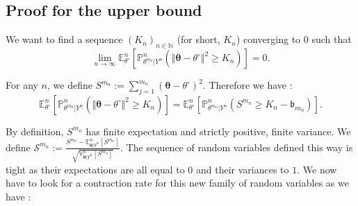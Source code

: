 %
%

\subsection{Proof for the upper bound}

We want to find a sequence $\left(K_{n}\right)_{n \in \mathds{N}}$ (for short, $K_{n}$) converging to $0$ such that
\[\lim\limits_{n \rightarrow \infty} \mathds{E}_{\theta^{\circ}}^{n}\left[\mathds{P}_{\theta^{m_{n}}\vert Y^{n}}^{n}\left(\Vert \boldsymbol{\theta} - \theta^{\circ} \Vert^{2} \geq K_{n}\right)\right] = 0.\]

For any $n$, we define $S^{m_{n}} := \sum_{j=1}^{m_{n}} \left(\boldsymbol{\theta} - \theta^{\circ}\right)^{2}$. Therefore we have : 
\[\mathds{E}_{\theta^{\circ}}^{n}\left[\mathds{P}_{\theta^{m_{n}}\vert Y^{n}}^{n}\left(\Vert \boldsymbol{\theta} - \theta^{\circ} \Vert^{2} \geq K_{n}\right)\right] = \mathds{E}_{\theta^{\circ}}^{n}\left[\mathds{P}_{\theta^{m_{n}}\vert Y^{n}}^{n}\left(S^{m_{n}} \geq K_{n} - \mathfrak{b}_{m_{n}}\right)\right].\]

By definition, $S^{m_{n}}$ has finite expectation and strictly positive, finite variance. We define $\mathcal{S}^{m_{n}} := \frac{S^{m_{n}} - \mathds{E}_{\boldsymbol{\theta} \vert Y^{n}}^{n}\left[S^{m_{n}}\right]}{\sqrt{\mathds{V}_{\boldsymbol{\theta}\vert Y^{n}}^{n}[S^{m_{n}}]}}.$ The sequence of random variables defined this way is tight as their expectations are all equal to $0$ and their variances to $1$. We now have to look for a contraction rate for this new family of random variables as we have :

